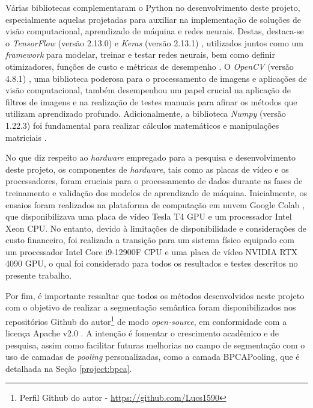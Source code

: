 Várias bibliotecas complementaram o Python no desenvolvimento deste projeto, especialmente aquelas projetadas para auxiliar na implementação de soluções de visão computacional, aprendizado de máquina e redes neurais. Destas, destaca-se o \textit{TensorFlow} (versão 2.13.0) \citep{MartinAbadi2015Systems} e \textit{Keras} (versão 2.13.1) \citep{Chollet2015Keras}, utilizados juntos como um \textit{framework} para modelar, treinar e testar redes neurais, bem como definir otimizadores, funções de custo e métricas de desempenho \citep{Geron2017Hands-onSystems, Chollet2021DeepPython}. O \textit{OpenCV} (versão 4.8.1) \citep{Bradski2000TheLibrary.}, uma biblioteca poderosa para o processamento de imagens e aplicações de visão computacional, também desempenhou um papel crucial na aplicação de filtros de imagens e na realização de testes manuais para afinar os métodos que utilizam aprendizado profundo. Adicionalmente, a biblioteca \textit{Numpy} (versão 1.22.3) \citep{Harris2020} foi fundamental para realizar cálculos matemáticos e manipulações matriciais \citep{Oliphant2007PythonComputing, VanDerWalt2011TheComputation}.

No que diz respeito ao \textit{hardware} empregado para a pesquisa e desenvolvimento deste projeto, os componentes de \textit{hardware}, tais como as placas de vídeo e os processadores, foram cruciais para o processamento de dados durante as fases de treinamento e validação dos modelos de aprendizado de máquina. Inicialmente, os ensaios foram realizados na plataforma de computação em nuvem Google Colab \citep{Bisong2019GoogleColaboratory}, que disponibilizava uma placa de vídeo Tesla T4 GPU e um processador Intel Xeon CPU. No entanto, devido à limitações de disponibilidade e considerações de custo financeiro, foi realizada a transição para um sistema físico equipado com um processador Intel Core i9-12900F CPU e uma placa de vídeo NVIDIA RTX 4090 GPU, o qual foi considerado para todos os resultados e testes descritos no presente trabalho.

Por fim, é importante ressaltar que todos os métodos desenvolvidos neste projeto com o objetivo de realizar a segmentação semântica foram disponibilizados nos repositórios Github do autor\footnote{Perfil Github do autor - \url{https://github.com/Lucs1590}} de modo \textit{open-source}, em conformidade com a licença Apache v2.0 \citep{Licenses}. A intenção é fomentar o crescimento acadêmico e de pesquisa, assim como facilitar futuras melhorias no campo de segmentação com o uso de camadas de \textit{pooling} personalizadas, como a camada BPCAPooling, que é detalhada na Seção \ref{project:bpca}.

